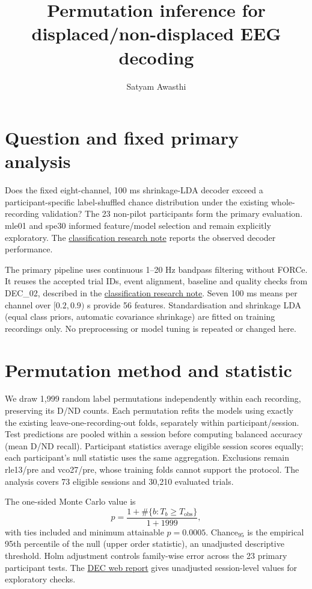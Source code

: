 \documentclass[11pt,a4paper]{article}
\title{Permutation inference for displaced/non-displaced EEG decoding}
\author{Satyam Awasthi}\date{}
\newcommand{\decwebreport}{\href{https://htmlpreview.github.io/?https://github.com/neurocontrol-lab/mouse-displacement-eeg/blob/main/output/DEC_decoding/report/index.html}{DEC web report}}
\newcommand{\classificationnote}{\href{https://github.com/neurocontrol-lab/mouse-displacement-eeg/blob/main/output/DEC_decoding/report/D_ND_classification_research_note.pdf}{classification research note}}
\begin{document}
\maketitle
\section{Question and fixed primary analysis}
Does the fixed eight-channel, 100 ms shrinkage-LDA decoder exceed a participant-specific label-shuffled chance distribution under the existing whole-recording validation? The 23 non-pilot participants form the primary evaluation. mle01 and spe30 informed feature/model selection and remain explicitly exploratory. The \classificationnote{} reports the observed decoder performance.

The primary pipeline uses continuous 1--20 Hz bandpass filtering without FORCe. It reuses the accepted trial IDs, event alignment, baseline and quality checks from DEC\_02, described in the \classificationnote{}. Seven 100 ms means per channel over $[0.2,0.9)$ s provide 56 features. Standardisation and shrinkage LDA (equal class priors, automatic covariance shrinkage) are fitted on training recordings only. No preprocessing or model tuning is repeated or changed here.

\section{Permutation method and statistic}
We draw 1,999 random label permutations independently within each recording, preserving its D/ND counts. Each permutation refits the models using exactly the existing leave-one-recording-out folds, separately within participant/session. Test predictions are pooled within a session before computing balanced accuracy (mean D/ND recall). Participant statistics average eligible session scores equally; each participant's null statistic uses the same aggregation. Exclusions remain rle13/pre and vco27/pre, whose training folds cannot support the protocol. The analysis covers 73 eligible sessions and 30,210 evaluated trials.

The one-sided Monte Carlo value is
\[
p=\frac{1+\#\{b:T_b\ge T_{\mathrm{obs}}\}}{1+1999},
\]
with ties included and minimum attainable $p=0.0005$. Chance$_{95}$ is the empirical 95th percentile of the null (upper order statistic), an unadjusted descriptive threshold. Holm adjustment controls family-wise error across the 23 primary participant tests. The \decwebreport{} gives unadjusted session-level values for exploratory checks.
\end{document}
